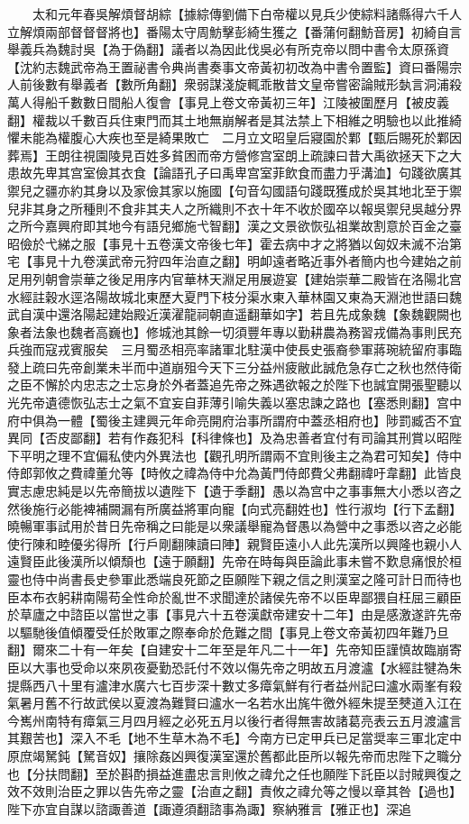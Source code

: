 　　太和元年春吳解煩督胡綜【據綜傳劉備下白帝權以見兵少使綜料諸縣得六千人立解煩兩部督督督將也】番陽太守周魴擊彭綺生獲之【番蒲何翻魴音房】初綺自言舉義兵為魏討吳【為于偽翻】議者以為因此伐吳必有所克帝以問中書令太原孫資【沈約志魏武帝為王置祕書令典尚書奏事文帝黃初初改為中書令置監】資曰番陽宗人前後數有舉義者【數所角翻】衆弱謀淺旋輒乖散昔文皇帝嘗密論賊形埶言洞浦殺萬人得船千數數日間船人復會【事見上卷文帝黃初三年】江陵被圍歷月【被皮義翻】權裁以千數百兵住東門而其土地無崩解者是其法禁上下相維之明驗也以此推綺懼未能為權腹心大疾也至是綺果敗亡　二月立文昭皇后寢園於鄴【甄后賜死於鄴因葬焉】王朗往視園陵見百姓多貧困而帝方營修宫室朗上疏諫曰昔大禹欲拯天下之大患故先卑其宫室儉其衣食【論語孔子曰禹卑宫室菲飲食而盡力乎溝洫】句踐欲廣其禦兒之疆亦約其身以及家儉其家以施國【句音勾國語句踐既獲成於吳其地北至于禦兒非其身之所種則不食非其夫人之所織則不衣十年不收於國卒以報吳禦兒吳越分界之所今嘉興府即其地今有語兒鄉施弋智翻】漢之文景欲恢弘祖業故割意於百金之臺昭儉於弋綈之服【事見十五卷漢文帝後七年】霍去病中才之將猶以匈奴未滅不治第宅【事見十九卷漢武帝元狩四年治直之翻】明卹遠者略近事外者簡内也今建始之前足用列朝會崇華之後足用序内官華林天淵足用展遊宴【建始崇華二殿皆在洛陽北宫水經註穀水逕洛陽故城北東歷大夏門下枝分渠水東入華林園又東為天淵池世語曰魏武自漢中還洛陽起建始殿近漢濯龍祠朝直遥翻華如字】若且先成象魏【象魏觀闕也象者法象也魏者高巍也】修城池其餘一切須豐年專以勤耕農為務習戎備為事則民充兵強而寇戎賓服矣　三月蜀丞相亮率諸軍北駐漢中使長史張裔參軍蔣琬統留府事臨發上疏曰先帝創業未半而中道崩殂今天下三分益州疲敝此誠危急存亡之秋也然侍衛之臣不懈於内忠志之士忘身於外者蓋追先帝之殊遇欲報之於陛下也誠宜開張聖聽以光先帝遺德恢弘志士之氣不宜妄自菲薄引喻失義以塞忠諫之路也【塞悉則翻】宫中府中俱為一體【蜀後主建興元年命亮開府治事所謂府中蓋丞相府也】陟罰臧否不宜異同【否皮鄙翻】若有作姦犯科【科律條也】及為忠善者宜付有司論其刑賞以昭陛下平明之理不宜偏私使内外異法也【觀孔明所謂兩不宜則後主之為君可知矣】侍中侍郎郭攸之費禕董允等【時攸之禕為侍中允為黃門侍郎費父弗翻禕吁韋翻】此皆良實志慮忠純是以先帝簡拔以遺陛下【遺于季翻】愚以為宫中之事事無大小悉以咨之然後施行必能裨補闕漏有所廣益將軍向寵【向式亮翻姓也】性行淑均【行下孟翻】曉暢軍事試用於昔日先帝稱之曰能是以衆議舉寵為督愚以為營中之事悉以咨之必能使行陳和睦優劣得所【行戶剛翻陳讀曰陣】親賢臣遠小人此先漢所以興隆也親小人遠賢臣此後漢所以傾頹也【遠于願翻】先帝在時每與臣論此事未嘗不歎息痛恨於桓靈也侍中尚書長史參軍此悉端良死節之臣願陛下親之信之則漢室之隆可計日而待也臣本布衣躬耕南陽苟全性命於亂世不求聞達於諸侯先帝不以臣卑鄙猥自枉屈三顧臣於草廬之中諮臣以當世之事【事見六十五卷漢獻帝建安十二年】由是感激遂許先帝以驅馳後值傾覆受任於敗軍之際奉命於危難之間【事見上卷文帝黃初四年難乃旦翻】爾來二十有一年矣【自建安十二年至是年凡二十一年】先帝知臣謹慎故臨崩寄臣以大事也受命以來夙夜憂勤恐託付不效以傷先帝之明故五月渡瀘【水經註犍為朱提縣西八十里有瀘津水廣六七百步深十數丈多瘴氣鮮有行者益州記曰瀘水兩峯有殺氣暑月舊不行故武侯以夏渡為難賢曰瀘水一名若水出旄牛徼外經朱提至僰道入江在今嶲州南特有瘴氣三月四月經之必死五月以後行者得無害故諸葛亮表云五月渡瀘言其艱苦也】深入不毛【地不生草木為不毛】今南方已定甲兵已足當奨率三軍北定中原庶竭駑鈍【駑音奴】攘除姦凶興復漢室還於舊都此臣所以報先帝而忠陛下之職分也【分扶問翻】至於斟酌損益進盡忠言則攸之禕允之任也願陛下託臣以討賊興復之效不效則治臣之罪以告先帝之靈【治直之翻】責攸之禕允等之慢以章其咎【過也】陛下亦宜自謀以諮諏善道【諏遵須翻諮事為諏】察納雅言【雅正也】深追
